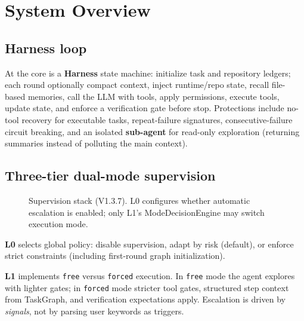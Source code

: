 \documentclass[11pt,a4paper]{article}
\begin{document}
\section{System Overview}
\label{sec:system}

\subsection{Harness loop}

At the core is a \textbf{Harness} state machine: initialize task and repository ledgers; each round optionally compact context, inject runtime/repo state, recall file-based memories, call the LLM with tools, apply permissions, execute tools, update state, and enforce a verification gate before stop.
Protections include no-tool recovery for executable tasks, repeat-failure signatures, consecutive-failure circuit breaking, and an isolated \textbf{sub-agent} for read-only exploration (returning summaries instead of polluting the main context).

\subsection{Three-tier dual-mode supervision}
\label{sec:dualmode}

\begin{figure}[ht]
\centering
{}
\caption{Supervision stack (V1.3.7). L0 configures whether automatic escalation is enabled; only L1's ModeDecisionEngine may switch execution mode.}
\label{fig:stack}
\end{figure}

\textbf{L0} selects global policy: disable supervision, adapt by risk (default), or enforce strict constraints (including first-round graph initialization).

\textbf{L1} implements \texttt{free} versus \texttt{forced} execution.
In \texttt{free} mode the agent explores with lighter gates; in \texttt{forced} mode stricter tool gates, structured step context from TaskGraph, and verification expectations apply.
Escalation is driven by \emph{signals}, not by parsing user keywords as triggers.
\end{document}
